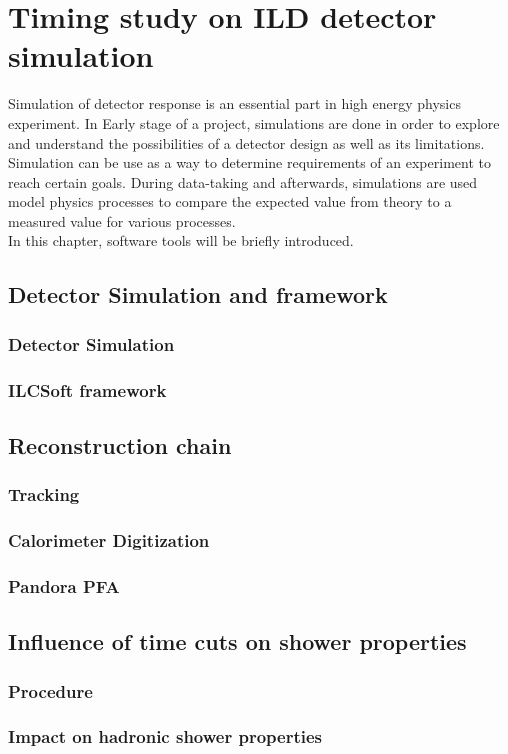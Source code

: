 \chapter{Timing study on ILD detector simulation}

Simulation of detector response is an essential part in high energy physics experiment. In Early stage of a project, simulations are done in order to explore and understand the possibilities of a detector design as well as its limitations. Simulation can be use as a way to determine requirements of an experiment to reach certain goals. During data-taking and afterwards, simulations are used model physics processes to compare  the expected value from theory to a measured value for various processes.\\

In this chapter, software tools will be briefly introduced.

\section{Detector Simulation and framework}

\subsection{Detector Simulation}
\subsection{ILCSoft framework}

\section{Reconstruction chain}

\subsection{Tracking}
\subsection{Calorimeter Digitization}
\subsection{Pandora PFA}

\section{Influence of time cuts on shower properties}

\subsection{Procedure}
\subsection{Impact on hadronic shower properties}
